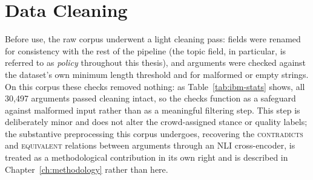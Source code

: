 \section{Data Cleaning}
\label{sec:corpus-ibm-cleaning}

Before use, the raw corpus underwent a light cleaning pass: fields were renamed for consistency
with the rest of the pipeline (the topic field, in particular, is referred to as \emph{policy}
throughout this thesis), and arguments were checked against the dataset's own minimum length
threshold and for malformed or empty strings. On this corpus these checks removed nothing: as
Table~\ref{tab:ibm-stats} shows, all 30{,}497 arguments passed cleaning intact, so the checks
function as a safeguard against malformed input rather than as a meaningful filtering step. This
step is deliberately minor and does not alter the crowd-assigned stance or quality labels; the
substantive preprocessing this corpus undergoes, recovering the \textsc{contradicts} and
\textsc{equivalent} relations between arguments through an NLI cross-encoder, is treated as a
methodological contribution in its own right and is described in Chapter~\ref{ch:methodology}
rather than here.